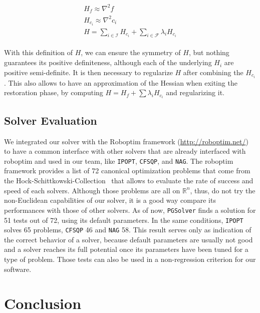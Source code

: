 \begin{align}
  \begin{split}
    H_f \approx \nabla^2 f\\
    H_{c_i} \approx \nabla^2 c_i\\
    H = \sum_{i\in \mathcal{I}}H_{c_i} + \sum_{i\in \mathcal{F}}\lambda_i H_{c_i}
  \end{split}
\end{align}

With this definition of $H$, we can ensure the symmetry of $H$, but nothing guarantees its positive definiteness, although each of the underlying $H_i$ are positive semi-definite.
It is then necessary to regularize $H$ after combining the $H_{c_i}$.
This also allows to have an approximation of the Hessian when exiting the restoration phase, by computing $H = H_f + \sum \lambda_i H_{c_i}$ and regularizing it.


\subsection{Solver Evaluation}
\label{sub:solver_evaluation}

We integrated our solver with the Roboptim framework (\href{http://roboptim.net/}{http://roboptim.net/}) to have a common interface with other solvers that are already interfaced with roboptim and used in our team, like {\tt IPOPT}, {\tt CFSQP}, and {\tt NAG}.
The roboptim framework provides a list of 72 canonical optimization problems that come from the Hock-Schittkowski-Collection~\cite{Hock1980} that allows to evaluate the rate of success and speed of each solvers.
Although those problems are all on $\mathbb{R}^n$, thus, do not try the non-Euclidean capabilities of our solver, it is a good way compare its performances with those of other solvers.
As of now, {\tt PGSolver} finds a solution for 51 tests out of 72, using its default parameters.
In the same conditions, {\tt IPOPT} solves 65 problems, {\tt CFSQP} 46 and {\tt NAG} 58.
This result serves only as indication of the correct behavior of a solver, because default parameters are usually not good and a solver reaches its full potential once its parameters have been tuned for a type of problem.
Those tests can also be used in a non-regression criterion for our software.

\section{Conclusion}
\label{sec:conclusion}


